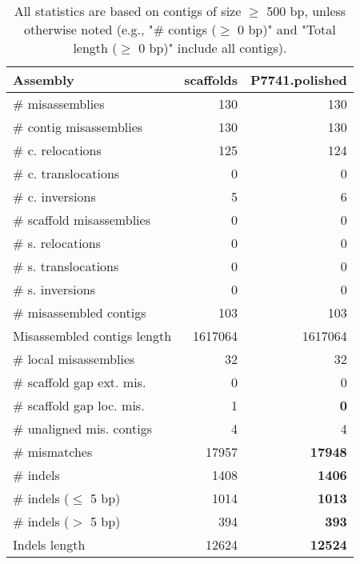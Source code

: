 \documentclass[12pt,a4paper]{article}
\begin{document}
\begin{table}[ht]
\begin{center}
\caption{All statistics are based on contigs of size $\geq$ 500 bp, unless otherwise noted (e.g., "\# contigs ($\geq$ 0 bp)" and "Total length ($\geq$ 0 bp)" include all contigs).}
\begin{tabular}{|l*{2}{|r}|}
\hline
Assembly & scaffolds & P7741.polished \\ \hline
\# misassemblies & 130 & 130 \\ \hline
\hspace{2mm}\# contig misassemblies & 130 & 130 \\ \hline
\hspace{5mm}\# c. relocations & 125 & 124 \\ \hline
\hspace{5mm}\# c. translocations & 0 & 0 \\ \hline
\hspace{5mm}\# c. inversions & 5 & 6 \\ \hline
\hspace{2mm}\# scaffold misassemblies & 0 & 0 \\ \hline
\hspace{5mm}\# s. relocations & 0 & 0 \\ \hline
\hspace{5mm}\# s. translocations & 0 & 0 \\ \hline
\hspace{5mm}\# s. inversions & 0 & 0 \\ \hline
\# misassembled contigs & 103 & 103 \\ \hline
Misassembled contigs length & 1617064 & 1617064 \\ \hline
\# local misassemblies & 32 & 32 \\ \hline
\# scaffold gap ext. mis. & 0 & 0 \\ \hline
\# scaffold gap loc. mis. & 1 & {\bf 0} \\ \hline
\# unaligned mis. contigs & 4 & 4 \\ \hline
\# mismatches & 17957 & {\bf 17948} \\ \hline
\# indels & 1408 & {\bf 1406} \\ \hline
\hspace{5mm}\# indels ($\leq$ 5 bp) & 1014 & {\bf 1013} \\ \hline
\hspace{5mm}\# indels ($>$ 5 bp) & 394 & {\bf 393} \\ \hline
Indels length & 12624 & {\bf 12524} \\ \hline
\end{tabular}
\end{center}
\end{table}
\end{document}
